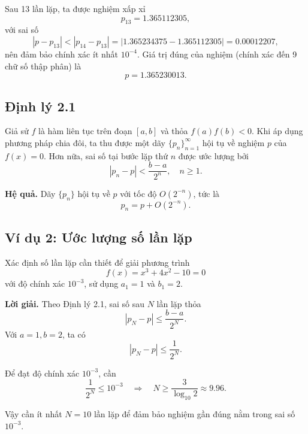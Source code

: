 Sau 13 lần lặp, ta được nghiệm xấp xỉ
\[
p_{13} = 1.365112305,
\]
với sai số
\[
|p - p_{13}| < |p_{14} - p_{13}| = |1.365234375 - 1.365112305| = 0.00012207,
\]
nên đảm bảo chính xác ít nhất $10^{-4}$.  
Giá trị đúng của nghiệm (chính xác đến 9 chữ số thập phân) là
\[
p = 1.365230013.
\]

\subsection*{\textbf{Định lý 2.1}}

Giả sử $f$ là hàm liên tục trên đoạn $[a,b]$ và thỏa $f(a)f(b) < 0$.  
Khi áp dụng phương pháp chia đôi, ta thu được một dãy $\{p_n\}_{n=1}^\infty$ hội tụ về nghiệm $p$ của $f(x)=0$.  
Hơn nữa, sai số tại bước lặp thứ $n$ được ước lượng bởi
\[
|p_n - p| < \frac{b-a}{2^n}, \quad n \geq 1.
\]

\textbf{Hệ quả.}  
Dãy $\{p_n\}$ hội tụ về $p$ với tốc độ $O(2^{-n})$, tức là
\[
p_n = p + O(2^{-n}).
\]

\subsection*{\textbf{Ví dụ 2: Ước lượng số lần lặp}}

Xác định số lần lặp cần thiết để giải phương trình
\[
f(x) = x^3 + 4x^2 - 10 = 0
\]
với độ chính xác $10^{-3}$, sử dụng $a_1 = 1$ và $b_1 = 2$.

\textbf{Lời giải.}  
Theo Định lý 2.1, sai số sau $N$ lần lặp thỏa
\[
|p_N - p| \leq \frac{b-a}{2^N}.
\]
Với $a=1, b=2$, ta có
\[
|p_N - p| \leq \frac{1}{2^N}.
\]

Để đạt độ chính xác $10^{-3}$, cần
\[
\frac{1}{2^N} \leq 10^{-3}
\quad \Rightarrow \quad
N \geq \frac{3}{\log_{10} 2} \approx 9.96.
\]

Vậy cần ít nhất $N=10$ lần lặp để đảm bảo nghiệm gần đúng nằm trong sai số $10^{-3}$.


